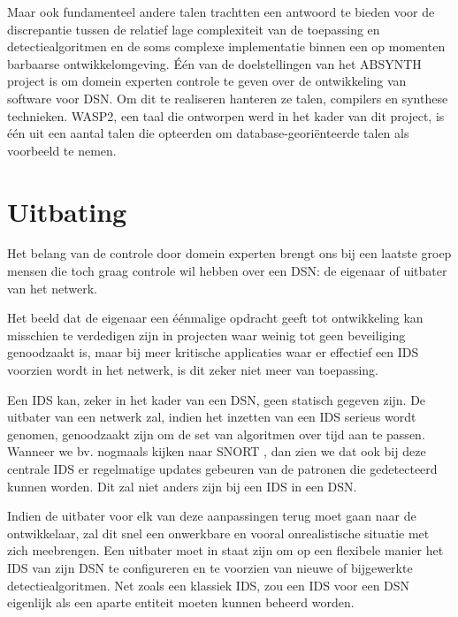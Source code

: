 Maar ook fundamenteel andere talen trachtten een antwoord te bieden voor de
discrepantie tussen de relatief lage complexiteit van de toepassing en
detectiealgoritmen en de soms complexe implementatie binnen een op momenten
barbaarse ontwikkelomgeving. \'E\'en van de doelstellingen van het ABSYNTH
project \citep{url:absynth} is om domein experten controle te geven over de
ontwikkeling van software voor DSN. Om dit te realiseren hanteren ze talen,
compilers en synthese technieken. WASP2, een taal die ontworpen werd in het
kader van dit project, is \'e\'en uit een aantal talen die opteerden om
database-geori\"enteerde talen als voorbeeld te nemen.

\section{Uitbating}
\label{section:problem-operations}

Het belang van de controle door domein experten brengt ons bij een laatste
groep mensen die toch graag controle wil hebben over een DSN: de eigenaar of
uitbater van het netwerk.

Het beeld dat de eigenaar een \'e\'enmalige opdracht geeft tot ontwikkeling kan
misschien te verdedigen zijn in projecten waar weinig tot geen beveiliging
genoodzaakt is, maar bij meer kritische applicaties waar er effectief een IDS
voorzien wordt in het netwerk, is dit zeker niet meer van toepassing.

Een IDS kan, zeker in het kader van een DSN, geen statisch gegeven zijn. De
uitbater van een netwerk zal, indien het inzetten van een IDS serieus wordt
genomen, genoodzaakt zijn om de set van algoritmen over tijd aan te passen.
Wanneer we bv. nogmaals kijken naar SNORT \citep{roesch1999snort}, dan zien we
dat ook bij deze centrale IDS er regelmatige updates gebeuren van de patronen
die gedetecteerd kunnen worden. Dit zal niet anders zijn bij een IDS in een DSN.

Indien de uitbater voor elk van deze aanpassingen terug moet gaan naar de
ontwikkelaar, zal dit snel een onwerkbare en vooral onrealistische situatie met
zich meebrengen. Een uitbater moet in staat zijn om op een flexibele manier het
IDS van zijn DSN te configureren en te voorzien van nieuwe of bijgewerkte
detectiealgoritmen. Net zoals een klassiek IDS, zou een IDS voor een DSN
eigenlijk als een aparte entiteit moeten kunnen beheerd worden.
